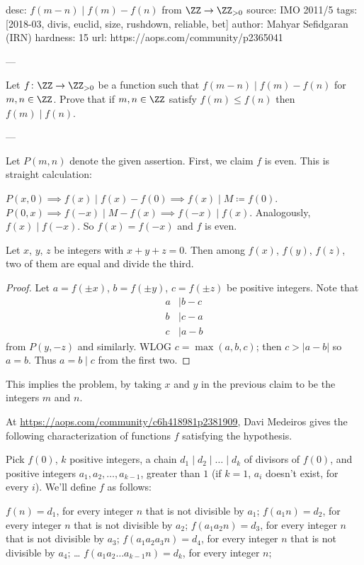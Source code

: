 desc: $f(m-n) \mid f(m)-f(n)$ from $\ZZ \to \ZZ_{>0}$
source: IMO 2011/5
tags: [2018-03, divis, euclid, size, rushdown, reliable, bet]
author: Mahyar Sefidgaran (IRN)
hardness: 15
url: https://aops.com/community/p2365041

---

Let $f \colon \ZZ \to \ZZ_{>0}$ be a function such that
$f(m-n) \mid f(m) - f(n)$ for $m,n \in \ZZ$.
Prove that if $m,n \in \ZZ$ satisfy $f(m) \le f(n)$
then $f(m) \mid f(n)$.

---

Let $P(m,n)$ denote the given assertion.
First, we claim $f$ is even.
This is straight calculation:
\begin{itemize}
  \ii $P(x,0) \implies f(x) \mid f(x)-f(0)
  \implies f(x) \mid M \coloneqq f(0)$.
  \ii $P(0,x) \implies f(-x) \mid M-f(x) \implies
  f(-x) \mid f(x)$.
  Analogously, $f(x) \mid f(-x)$.
  So $f(x) = f(-x)$ and $f$ is even.
\end{itemize}

\begin{claim*}
  Let $x$, $y$, $z$ be integers with $x+y+z=0$.
  Then among $f(x)$, $f(y)$, $f(z)$,
  two of them are equal and divide the third.
\end{claim*}
\begin{proof}
  Let $a = f(\pm x)$, $b = f(\pm y)$, $c = f(\pm z)$
  be positive integers.
  Note that
  \begin{align*}
    a &\mid b-c \\
    b &\mid c-a \\
    c &\mid a-b
  \end{align*}
  from $P(y,-z)$ and similarly.
  WLOG $c = \max(a,b,c)$; then $c > |a-b|$
  so $a=b$.  Thus $a=b \mid c$ from the first two.
\end{proof}
This implies the problem,
by taking $x$ and $y$ in the previous claim
to be the integers $m$ and $n$.

\begin{remark*}
  At \url{https://aops.com/community/c6h418981p2381909},
  Davi Medeiros gives the following characterization
  of functions $f$ satisfying the hypothesis.

  Pick $f(0)$, $k$ positive integers,
  a chain $d_1 \mid d_2 \mid \dots \mid d_k$ of divisors of $f(0)$,
  and positive integers $a_1,a_2,\dots,a_{k-1}$,
  greater than $1$ (if $k=1$, $a_i$ doesn't exist, for every $i$).
  We'll define $f$ as follows:
  \begin{itemize}
    \ii $f(n)=d_1$, for every integer $n$ that is not divisible by $a_1$;
    \ii $f(a_1n)=d_2$, for every integer $n$ that is not divisible by $a_2$;
    \ii $f(a_1a_2n)=d_3$, for every integer $n$ that is not divisible by $a_3$;
    \ii $f(a_1a_2a_3n)=d_4$, for every integer $n$ that is not divisible by $a_4$;
    \ii \dots
    \ii $f(a_1a_2 \dots a_{k-1}n)=d_k$, for every integer $n$;
  \end{itemize}
\end{remark*}
